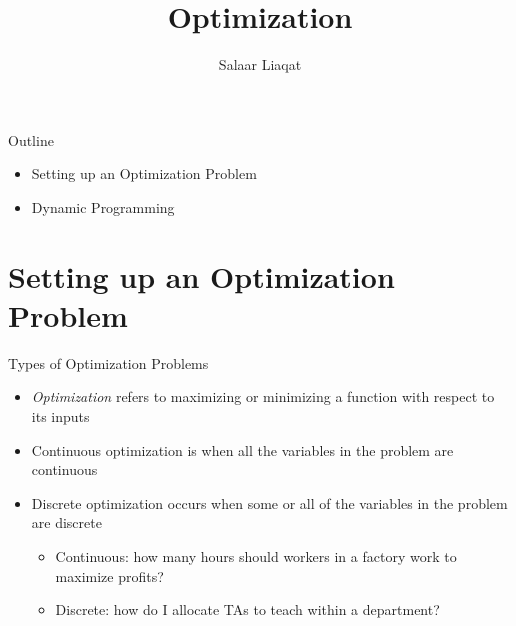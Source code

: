 \documentclass[
  ignorenonframetext,
]{beamer}
\title{Optimization}
\author{Salaar Liaqat}
\date{}
\institute{Data Sciences Institute, UofT}
\begin{document}
\frame{\titlepage}
\ifdefined\Shaded\renewenvironment{Shaded}{\begin{tcolorbox}[boxrule=0pt, interior hidden, borderline west={3pt}{0pt}{shadecolor}, enhanced, frame hidden, breakable, sharp corners]}{\end{tcolorbox}}\fi

\begin{frame}{Outline}
\protect\hypertarget{outline}{}
\begin{itemize}
\item
  Setting up an Optimization Problem
\item
  Dynamic Programming
\end{itemize}
\end{frame}

\hypertarget{setting-up-an-optimization-problem}{%
\section{Setting up an Optimization
Problem}\label{setting-up-an-optimization-problem}}

\begin{frame}{Types of Optimization Problems}
\protect\hypertarget{types-of-optimization-problems}{}
\begin{itemize}
\item
  \emph{Optimization} refers to maximizing or minimizing a function with
  respect to its inputs
\item
  Continuous optimization is when all the variables in the problem are
  continuous
\item
  Discrete optimization occurs when some or all of the variables in the
  problem are discrete

  \begin{itemize}
  \item
    Continuous: how many hours should workers in a factory work to
    maximize profits?
  \item
    Discrete: how do I allocate TAs to teach within a department?
  \end{itemize}
\end{itemize}
\end{frame}
\end{document}
